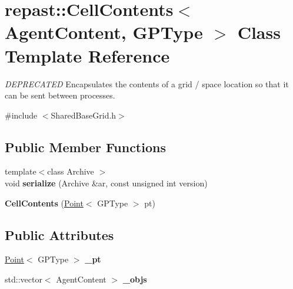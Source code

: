 \hypertarget{classrepast_1_1_cell_contents}{\section{repast\-:\-:Cell\-Contents$<$ Agent\-Content, G\-P\-Type $>$ Class Template Reference}
\label{classrepast_1_1_cell_contents}
}


{\itshape D\-E\-P\-R\-E\-C\-A\-T\-E\-D} Encapsulates the contents of a grid / space location so that it can be sent between processes.  




{\ttfamily \#include $<$Shared\-Base\-Grid.\-h$>$}

\subsection*{Public Member Functions}
\begin{DoxyCompactItemize}
\item 
\hypertarget{classrepast_1_1_cell_contents_afbe0f0f9af0d4d9351be254522984db6}{{\footnotesize template$<$class Archive $>$ }\\void {\bfseries serialize} (Archive \&ar, const unsigned int version)}\label{classrepast_1_1_cell_contents_afbe0f0f9af0d4d9351be254522984db6}

\item 
\hypertarget{classrepast_1_1_cell_contents_afbd1679d216cdef051c0fc985327925f}{{\bfseries Cell\-Contents} (\hyperlink{classrepast_1_1_point}{Point}$<$ G\-P\-Type $>$ pt)}\label{classrepast_1_1_cell_contents_afbd1679d216cdef051c0fc985327925f}

\end{DoxyCompactItemize}
\subsection*{Public Attributes}
\begin{DoxyCompactItemize}
\item 
\hypertarget{classrepast_1_1_cell_contents_a77ce242dc0f59276008fdfb42a8db000}{\hyperlink{classrepast_1_1_point}{Point}$<$ G\-P\-Type $>$ {\bfseries \-\_\-pt}}\label{classrepast_1_1_cell_contents_a77ce242dc0f59276008fdfb42a8db000}

\item 
\hypertarget{classrepast_1_1_cell_contents_ad33d7bbe7d5b66190414d1e5e6791c50}{std\-::vector$<$ Agent\-Content $>$ {\bfseries \-\_\-objs}}\label{classrepast_1_1_cell_contents_ad33d7bbe7d5b66190414d1e5e6791c50}

\end{DoxyCompactItemize}
